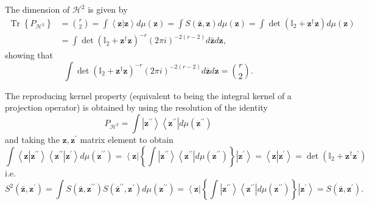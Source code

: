\documentclass[aps,preprint]{revtex4}%
\begin{document}
The dimension of $\mathcal{H}^{2}$ is given by
\begin{align}
\operatorname*{Tr}\left\{  P_{\mathcal{H}^{2}}\right\}   &  =\binom{r}{2}%
=\int\left\langle \mathbf{z}\left\vert \mathbf{z}\right.  \right\rangle
d\mu\left(  \mathbf{z}\right)  =\int S\left(  \mathbf{\bar{z},z}\right)
d\mu\left(  \mathbf{z}\right)  =\int\det\left(  \mathbb{I}_{2}+\mathbf{z}%
^{\dagger}\mathbf{z}\right)  d\mu\left(  \mathbf{z}\right) \nonumber\\
&  =\int\det\left(  \mathbb{I}_{2}+\mathbf{z}^{\dagger}\mathbf{z}\right)
^{-r}\left(  2\pi i\right)  ^{-2\left(  r-2\right)  }d\mathbf{\bar{z}%
}d\mathbf{z,}%
\end{align}
showing that
\begin{equation}
\int\det\left(  \mathbb{I}_{2}+\mathbf{z}^{\dagger}\mathbf{z}\right)
^{-r}\left(  2\pi i\right)  ^{-2\left(  r-2\right)  }d\mathbf{\bar{z}%
}d\mathbf{z}=\binom{r}{2}.
\end{equation}


The reproducing kernel property (equivalent to being the integral kernel of a
projection operator) is obtained by using the resolution of the identity
\begin{equation}
P_{\mathcal{H}^{2}}=\int\left\vert \mathbf{z}^{\prime\prime}\right\rangle
\left\langle \mathbf{z}^{\prime\prime}\right\vert d\mu\left(  \mathbf{z}%
^{\prime\prime}\right)
\end{equation}
and taking the $\mathbf{z,z}^{\prime}$ matrix element to obtain
\begin{equation}
\int\left\langle \mathbf{z}\left\vert \mathbf{z}^{\prime\prime}\right.
\right\rangle \left\langle \mathbf{z}^{\prime\prime}\left\vert \mathbf{z}%
^{\prime}\right.  \right\rangle d\mu\left(  \mathbf{z}^{\prime\prime}\right)
=\left\langle \mathbf{z}\right\vert \left\{  \int\left\vert \mathbf{z}%
^{\prime\prime}\right\rangle \left\langle \mathbf{z}^{\prime\prime}\right\vert
d\mu\left(  \mathbf{z}^{\prime\prime}\right)  \right\}  \left\vert
\mathbf{z}^{\prime}\right\rangle =\left\langle \mathbf{z}\left\vert
\mathbf{z}^{\prime}\right.  \right\rangle =\det\left(  \mathbb{I}%
_{2}+\mathbf{z}^{\dagger}\mathbf{z}^{\prime}\right)
\end{equation}
i.e.
\begin{equation}
S^{2}\left(  \mathbf{\bar{z}},\mathbf{z}^{\prime}\right)  =\int S\left(
\mathbf{\bar{z},z}^{\prime\prime}\right)  S\left(  \mathbf{\bar{z}}%
^{\prime\prime},\mathbf{z}^{\prime}\right)  d\mu\left(  \mathbf{z}%
^{\prime\prime}\right)  =\left\langle \mathbf{z}\right\vert \left\{
\int\left\vert \mathbf{z}^{\prime\prime}\right\rangle \left\langle
\mathbf{z}^{\prime\prime}\right\vert d\mu\left(  \mathbf{z}^{\prime\prime
}\right)  \right\}  \left\vert \mathbf{z}^{\prime}\right\rangle =S\left(
\mathbf{\bar{z}},\mathbf{z}^{\prime}\right)  .
\end{equation}
\end{document}

